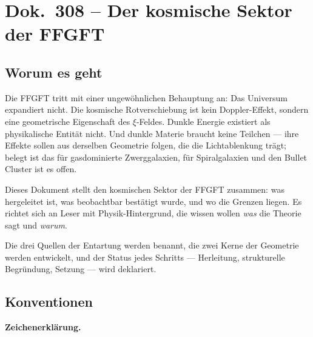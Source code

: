 \maketitle
\tableofcontents

\chapter*{Dok.~308 -- Der kosmische Sektor der FFGFT}


\section*{Worum es geht}

Die FFGFT tritt mit einer ungewöhnlichen Behauptung an: Das Universum
expandiert nicht. Die kosmische Rotverschiebung ist kein Doppler-Effekt,
sondern eine geometrische Eigenschaft des $\xi$-Feldes. Dunkle Energie
existiert als physikalische Entität nicht. Und dunkle Materie braucht
keine Teilchen — ihre Effekte sollen aus derselben Geometrie folgen, die die
Lichtablenkung trägt; belegt ist das für gasdominierte Zwerggalaxien,
für Spiralgalaxien und den Bullet Cluster ist es offen.

Dieses Dokument stellt den kosmischen Sektor der FFGFT zusammen:
was hergeleitet ist, was beobachtbar bestätigt wurde, und wo die
Grenzen liegen. Es richtet sich an Leser mit Physik-Hintergrund,
die wissen wollen \emph{was} die Theorie sagt und \emph{warum}.

Die drei Quellen der Entartung werden benannt, die zwei Kerne der
Geometrie werden entwickelt, und der Status jedes Schritts — Herleitung,
strukturelle Begründung, Setzung — wird deklariert.

\section*{Konventionen}

\noindent\textbf{Zeichenerklärung.}

\medskip


